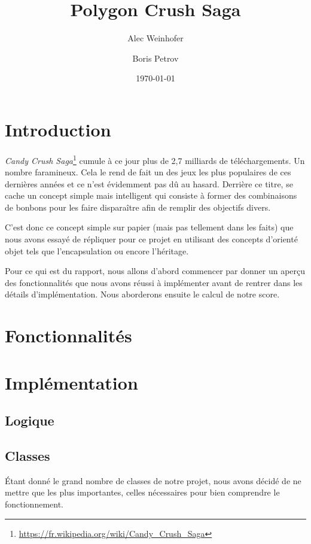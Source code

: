 \documentclass[11pt,a4paper]{article}
\title{Polygon Crush Saga}
\author{Alec Weinhofer \and Boris Petrov}
\date{\today}
\begin{document}
\maketitle
\tableofcontents


\section{Introduction}

\emph{Candy Crush Saga}\footnote{\url{https://fr.wikipedia.org/wiki/Candy_Crush_Saga}}
cumule à ce jour plus de 2,7 milliards de
téléchargements. Un nombre faramineux. Cela le rend de fait
un des jeux les plus populaires de ces dernières années et
ce n'est évidemment pas dû au hasard. Derrière ce titre, se
cache un concept simple mais intelligent qui consiste à
former des combinaisons de bonbons pour les faire
disparaître afin de remplir des objectifs divers.

C'est donc ce concept simple sur papier (mais pas tellement
dans les faits) que nous avons essayé de répliquer pour ce
projet en utilisant des concepts d'orienté objet tels que
l'encapsulation ou encore l'héritage.

Pour ce qui est du rapport, nous allons d'abord commencer par donner un aperçu des
fonctionnalités que nous avons réussi à implémenter avant de
rentrer dans les détails d'implémentation.
Nous aborderons ensuite le calcul de notre score.

\section{Fonctionnalités}

\section{Implémentation}
\subsection{Logique}

\subsection{Classes}

Étant donné le grand nombre de classes de notre projet, nous
avons décidé de ne mettre que les plus importantes, celles
nécessaires pour bien comprendre le fonctionnement.
\end{document}
